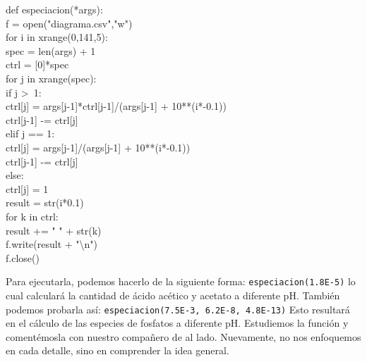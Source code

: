 \documentclass[10pt,letterpaper]{article}
\newcommand{\inlinecode}[1]{
\colorbox{light-gray}{\texttt{#1}}
}
\newenvironment{Code}
{
\begin{lrbox}{\selvestebox}%
\begin{minipage}{\dimexpr\columnwidth-2\fboxsep\relax}
\fontfamily{\ttdefault}\selectfont
}
{\end{minipage}\end{lrbox}%
\begin{center}
\colorbox{light-gray}{\usebox{\selvestebox}}
\end{center}
}
\begin{document}
\begin{Code}
def especiacion(*args):\\
\hspace*{6mm} f = open("diagrama.csv","w")\\
\hspace*{6mm} for i in xrange(0,141,5):\\
\hspace*{13mm} spec = len(args) + 1\\
\hspace*{13mm} ctrl = [0]*spec\\
\hspace*{13mm} for j in xrange(spec):\\
\hspace*{21mm} if j >\ 1:\\
\hspace*{28mm} ctrl[j] = args[j-1]*ctrl[j-1]/(args[j-1] + 10**(i*-0.1))\\
\hspace*{28mm} ctrl[j-1] -= ctrl[j]\\
\hspace*{21mm} elif j == 1:\\
\hspace*{28mm} ctrl[j] = args[j-1]/(args[j-1] + 10**(i*-0.1))\\
\hspace*{28mm} ctrl[j-1] -= ctrl[j]\\
\hspace*{21mm} else:\\
\hspace*{28mm} ctrl[j] = 1\\
\hspace*{13mm} result = str(i*0.1)\\
\hspace*{13mm} for k in ctrl:\\
\hspace*{21mm} result += " " + str(k)\\
\hspace*{13mm} f.write(result + "\textbackslash n")\\
\hspace*{6mm} f.close()
\end{Code}

Para ejecutarla, podemos hacerlo de la siguiente forma: \inlinecode{especiacion(1.8E-5)} lo cual calcular\'a la cantidad de \'acido ac\'etico y acetato a diferente pH. Tambi\'en podemos probarla as\'i: \inlinecode{especiacion(7.5E-3, 6.2E-8, 4.8E-13)} Esto resultar\'a en el c\'alculo de las especies de fosfatos a diferente pH. Estudiemos la funci\'on y coment\'emosla con nuestro compa\~nero de al lado. Nuevamente, no nos enfoquemos en cada detalle, sino en comprender la idea general.\\
\end{document}
